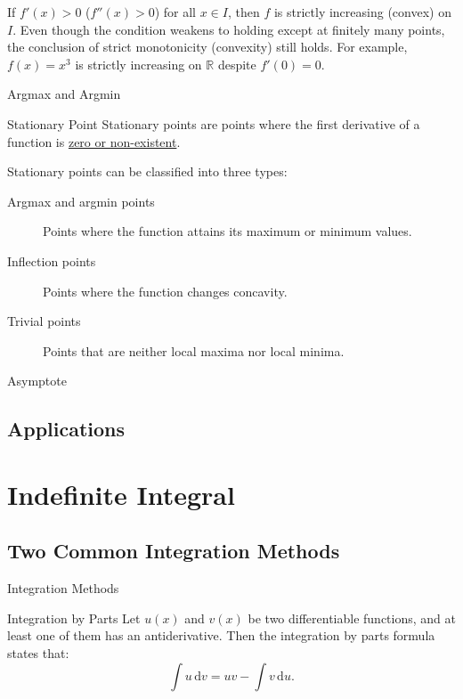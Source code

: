\documentclass[11pt]{../../TexTemplate/elegantbook}
\begin{document}
\begin{note}
    If \(f'(x) > 0\) (\(f''(x) > 0\)) for all \(x \in I\), then \(f\) is strictly increasing (convex) on \(I\).
    Even though the condition weakens to holding except at finitely many points,
    the conclusion of strict monotonicity (convexity) still holds.
    For example, \(f(x) = x^3\) is strictly increasing on \(\mathbb{R}\)
    despite \(f'(0) = 0\).
\end{note}



\begin{leftbarTitle}{Argmax and Argmin}\end{leftbarTitle}

\begin{definition}{Stationary Point}
    Stationary points are points where the first derivative of a function is \underline{zero or non-existent}.
\end{definition}
Stationary points can be classified into three types:
\begin{description}
    \item[Argmax and argmin points] Points where the function attains its maximum or minimum values.
    \item[Inflection points] Points where the function changes concavity.
    \item[Trivial points] Points that are neither local maxima nor local minima.
\end{description}


\begin{leftbarTitle}{Asymptote}\end{leftbarTitle}







\section{Applications}




\chapter{Indefinite Integral}

\section{Two Common Integration Methods}
\begin{leftbarTitle}{Integration Methods}\end{leftbarTitle}
\begin{definition}{Integration by Parts}
    Let \( u(x) \) and \( v(x) \) be two differentiable functions,
    and at least one of them has an antiderivative.
    Then the integration by parts formula states that:
    \[
        \int u \, \mathrm{d}v = uv - \int v \, \mathrm{d}u.
    \]
\end{definition}
\end{document}

